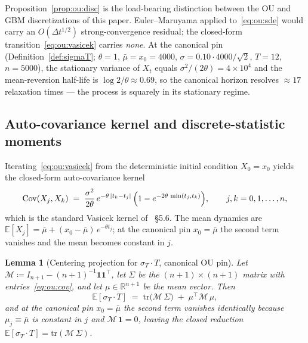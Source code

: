 \documentclass[11pt,letterpaper]{article}
\newtheorem{lemma}{Lemma}[section]
\newcommand{\E}{\mathbb{E}}
\newcommand{\Cov}{\text{Cov}}
\newcommand{\R}{\mathbb{R}}
\newcommand{\sigmaT}{\sigma_{T}}
\newcommand{\centerProj}{\mathcal{M}}
\begin{document}
Proposition~\ref{prop:ou:disc} is the load-bearing distinction between the
OU and GBM discretizations of this paper. Euler--Maruyama applied
to~\eqref{eq:ou:sde} would carry an $O(\Delta t^{1/2})$ strong-convergence
residual; the closed-form transition~\eqref{eq:ou:vasicek} carries
\emph{none}. At the canonical pin (Definition~\ref{def:sigmaT};
$\theta = 1$, $\bar\mu = x_{0} = 4000$, $\sigma = 0.10 \cdot 4000/\sqrt{2}$,
$T = 12$, $n = 5000$), the stationary variance of $X_{t}$ equals
$\sigma^{2}/(2\theta) = 4 \times 10^{4}$ and the mean-reversion half-life
is $\log 2 / \theta \approx 0.69$, so the canonical horizon resolves
$\approx 17$ relaxation times — the process is squarely in its stationary
regime.

\subsection{Auto-covariance kernel and discrete-statistic moments}
\label{sec:ou:autocov}

Iterating~\eqref{eq:ou:vasicek} from the deterministic initial condition
$X_{0} = x_{0}$ yields the closed-form auto-covariance kernel
\begin{equation}
    \Cov(X_{j}, X_{k})
    \;=\;
    \frac{\sigma^{2}}{2\theta}\,
    e^{-\theta\,|t_{k} - t_{j}|}\,
    \Bigl(1 - e^{-2\theta\,\min(t_{j}, t_{k})}\Bigr),
    \qquad j, k = 0, 1, \dots, n,
    \label{eq:ou:cov}
\end{equation}
which is the standard Vasicek kernel of \cite{karatzas-shreve-1991}~\S5.6.
The mean dynamics are $\E[X_{j}] = \bar\mu + (x_{0} - \bar\mu)\,e^{-\theta t_{j}}$;
at the canonical pin $x_{0} = \bar\mu$ the second term vanishes and the mean
becomes constant in $j$.

\begin{lemma}[Centering projection for $\sigmaT \cdot T$, canonical OU pin]
\label{lem:ou:proj}
Let $\centerProj \coloneqq I_{n+1} - (n+1)^{-1}\mathbf{1}\mathbf{1}^{\top}$,
let $\Sigma$ be the $(n+1)\times(n+1)$ matrix with entries~\eqref{eq:ou:cov},
and let $\mu \in \R^{n+1}$ be the mean vector. Then
\begin{equation}
    \E[\sigmaT \cdot T]
    \;=\;
    \mathrm{tr}\bigl(\centerProj\,\Sigma\bigr)
    \;+\; \mu^{\top}\centerProj\,\mu,
    \label{eq:ou:trace-id}
\end{equation}
and at the canonical pin $x_{0} = \bar\mu$ the second term vanishes
identically because $\mu_{j} \equiv \bar\mu$ is constant in $j$ and
$\centerProj\,\mathbf{1} = 0$, leaving the closed reduction
$\E[\sigmaT \cdot T] = \mathrm{tr}(\centerProj\,\Sigma)$.
\end{lemma}
\end{document}
